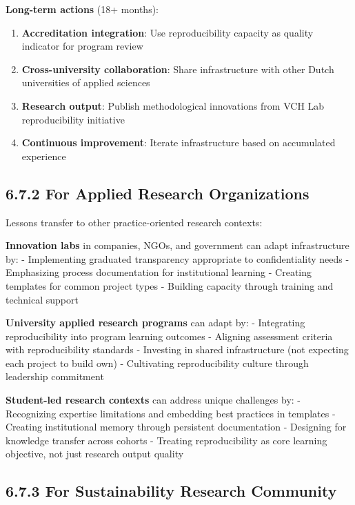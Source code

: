 \documentclass[
  oneside,
  open=any]{scrbook}
\providecommand{\tightlist}{%
  \setlength{\itemsep}{0pt}\setlength{\parskip}{0pt}}\usepackage{longtable,booktabs,array}
\begin{document}
\textbf{Long-term actions} (18+ months):

\begin{enumerate}
\def\labelenumi{\arabic{enumi}.}
\tightlist
\item
  \textbf{Accreditation integration}: Use reproducibility capacity as
  quality indicator for program review
\item
  \textbf{Cross-university collaboration}: Share infrastructure with
  other Dutch universities of applied sciences
\item
  \textbf{Research output}: Publish methodological innovations from VCH
  Lab reproducibility initiative
\item
  \textbf{Continuous improvement}: Iterate infrastructure based on
  accumulated experience
\end{enumerate}

\subsection{6.7.2 For Applied Research
Organizations}\label{for-applied-research-organizations}

Lessons transfer to other practice-oriented research contexts:

\textbf{Innovation labs} in companies, NGOs, and government can adapt
infrastructure by: - Implementing graduated transparency appropriate to
confidentiality needs - Emphasizing process documentation for
institutional learning - Creating templates for common project types -
Building capacity through training and technical support

\textbf{University applied research programs} can adapt by: -
Integrating reproducibility into program learning outcomes - Aligning
assessment criteria with reproducibility standards - Investing in shared
infrastructure (not expecting each project to build own) - Cultivating
reproducibility culture through leadership commitment

\textbf{Student-led research contexts} can address unique challenges by:
- Recognizing expertise limitations and embedding best practices in
templates - Creating institutional memory through persistent
documentation - Designing for knowledge transfer across cohorts -
Treating reproducibility as core learning objective, not just research
output quality

\subsection{6.7.3 For Sustainability Research
Community}\label{for-sustainability-research-community}
\end{document}
